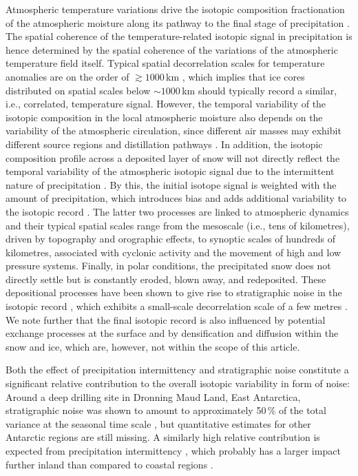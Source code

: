 \documentclass[cp, manuscript]{copernicus}
\begin{document}
Atmospheric temperature variations drive the isotopic composition fractionation
of the atmospheric moisture along its pathway to the final stage of
precipitation \citep{Dansgaard1964,Jouzel1984}. The spatial coherence of the
temperature-related isotopic signal in precipitation is hence determined by the
spatial coherence of the variations of the atmospheric temperature field
itself. Typical spatial decorrelation scales for temperature anomalies are on
the order of $\gtrsim1000$\,km \citep{Jones1997}, which implies that ice cores
distributed on spatial scales below $\sim 1000$\,km should typically record a
similar, i.e., correlated, temperature signal. However, the temporal variability
of the isotopic composition in the local atmospheric moisture also depends on
the variability of the atmospheric circulation, since different air masses may
exhibit different source regions and distillation pathways \citep{Schlosser2004,
Sodemann2008a,Birks2009,Kuttel2012}. In addition, the isotopic composition
profile across a deposited layer of snow will not directly reflect the temporal
variability of the atmospheric isotopic signal due to the intermittent nature of
precipitation \citep{Schleiss2015}. By this, the initial isotope signal is
weighted with the amount of precipitation, which introduces bias
\citep{Steig1994,Laepple2011a} and adds additional variability to the isotopic
record \citep{Persson2011,Casado2020}. The latter two processes are linked to
atmospheric dynamics and their typical spatial scales range from the mesoscale
(i.e., tens of kilometres), driven by topography and orographic effects, to
synoptic scales of hundreds of kilometres, associated with cyclonic activity and
the movement of high and low pressure systems. Finally, in polar conditions, the
precipitated snow does not directly settle but is constantly eroded, blown away,
and redeposited. These depositional processes have been shown to give rise to
stratigraphic noise in the isotopic record
\citep{Fisher1985,Munch2016,Laepple2016}, which exhibits a small-scale
decorrelation scale of a few metres \citep{Munch2016}. We note further that the
final isotopic record is also influenced by potential exchange processes at the
surface and by densification and diffusion within the snow and ice, which are,
however, not within the scope of this article.

Both the effect of precipitation intermittency and stratigraphic noise
constitute a significant relative contribution to the overall isotopic
variability in form of noise: Around a deep drilling site in Dronning Maud Land,
East Antarctica, stratigraphic noise was shown to amount to approximately 50\,\%
of the total variance at the seasonal time scale \citep{Munch2016}, but
quantitative estimates for other Antarctic regions are still missing. A
similarly high relative contribution is expected from precipitation
intermittency \citep{Laepple2018}, which probably has a larger impact further
inland than compared to coastal regions \citep{Casado2020,Hatvani2017}.
\end{document}
